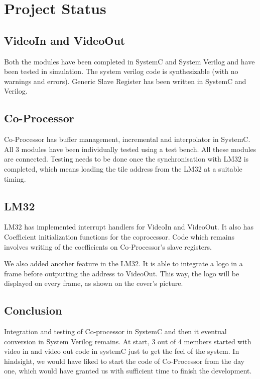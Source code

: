 

\section{Project Status}

\subsection{VideoIn and VideoOut}
Both the modules have been completed in SystemC and System Verilog and have been tested in simulation. The system verilog code is synthesizable (with no warnings and errors). Generic Slave Register has been written in SystemC and Verilog. 

\subsection{Co-Processor}
Co-Processor has buffer management, incremental and interpolator in SystemC. All 3 modules have been individually tested using a test bench. All these modules are connected. Testing needs to be done once the synchronisation with LM32 is completed, which means loading the tile address from the LM32 at a suitable timing. 

\subsection{LM32}
LM32 has implemented interrupt handlers for VideoIn and VideoOut. It also has Coefficient initialization functions for the coprocessor. Code which remains involves writing of the coefficients on Co-Processor's slave registers.

We also added another feature in the LM32. It is able to integrate a logo in a frame before outputting the address to VideoOut. This way, the logo will be displayed on every frame, as shown on the cover's picture.

\subsection{Conclusion}
Integration and testing of Co-processor in SystemC and then it eventual conversion in System Verilog remains. At start, 3 out of 4 members started with video in and video out code in systemC just to get the feel of the system. In hindsight, we would have liked to start the code of Co-Processor from the day one, which would have granted us with sufficient time to finish the development.


